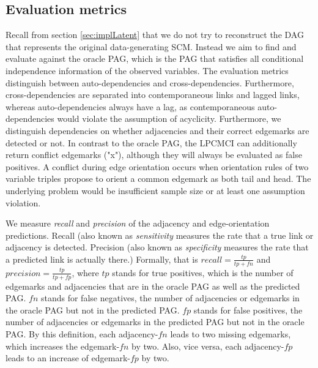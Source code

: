 \documentclass[conference]{IEEEtran}
\begin{document}
\subsection{Evaluation metrics}
\label{sec:eval}
Recall from section \ref{sec:implLatent} that we do not try to reconstruct the DAG that represents the original data-generating SCM. Instead we aim to find and evaluate against the oracle PAG, which is the PAG that satisfies all conditional independence information of the observed variables. 
The evaluation metrics distinguish between auto-dependencies and cross-dependencies. 
Furthermore, cross-dependencies are separated into contemporaneous links and lagged links, whereas auto-dependencies always have a lag, as contemporaneous auto-dependencies would violate the assumption of acyclicity.
Furthermore, we distinguish dependencies on whether adjacencies and their correct edgemarks are detected or not. In contrast to the oracle PAG, the LPCMCI can additionally return conflict edgemarks ("x"), although they will always be evaluated as false positives.
A conflict during edge orientation occurs when orientation rules of two variable triples propose to orient a common edgemark as both tail and head\cite{runge_pcmci_2020}. The underlying problem would be insufficient sample size or at least one assumption violation\cite{runge_tigramite_2022}.

We measure \textit{recall} and \textit{precision} of the adjacency and edge-orientation predictions. Recall (also known as \textit{sensitivity} measures the rate that a true link or adjacency is detected. Precision (also known as \textit{specificity} measures the rate that a predicted link is actually there.) Formally, that is $recall = \frac{tp}{tp+fn}$ and $precision = \frac{tp}{tp+fp}$, where
$tp$ stands for true positives, which is the number of edgemarks and adjacencies that are in the oracle PAG as well as the predicted PAG.
$fn$ stands for false negatives,  the number of adjacencies or edgemarks in the oracle PAG but not in the predicted PAG.
$fp$ stands for false positives, the number of adjacencies or edgemarks in the predicted PAG but not in the oracle PAG.
By this definition, each adjacency-$fn$ leads to two missing edgemarks, which increases the edgemark-$fn$ by two.
Also, vice versa, each adjacency-$fp$ leads to an increase of edgemark-$fp$ by two.
\end{document}
